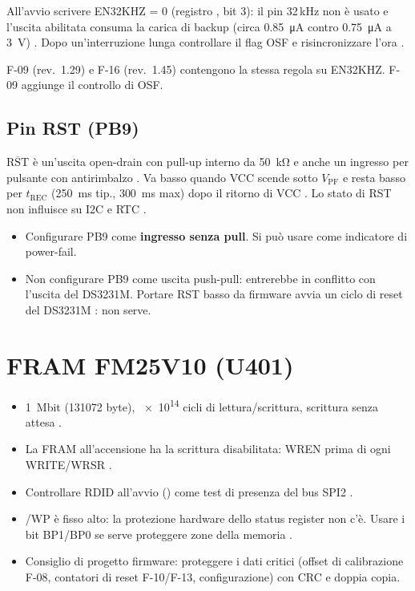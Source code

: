 \begin{regola}[F-09 e F-16: DS3231M]
All'avvio scrivere EN32KHZ = 0 (registro , bit 3): il pin 32\,kHz non è usato e l'uscita abilitata consuma la carica di backup (circa \SI{0.85}{\micro\ampere} contro \SI{0.75}{\micro\ampere} a \SI{3}{\volt}) . Dopo un'interruzione lunga controllare il flag OSF e risincronizzare l'ora .
\end{regola}

\begin{nota}[F-09 e F-16]
F-09 (rev.\ 1.29) e F-16 (rev.\ 1.45) contengono la stessa regola su EN32KHZ. F-09 aggiunge il controllo di OSF.
\end{nota}

\subsection{Pin RST (PB9)}
\label{sec:rtc-rst}
\(\overline{\mathrm{RST}}\) è un'uscita open-drain con pull-up interno da \SI{50}{\kilo\ohm} e anche un ingresso per pulsante con antirimbalzo . Va basso quando VCC scende sotto $V_\text{PF}$ e resta basso per $t_\text{REC}$ (\SI{250}{\milli\second} tip., \SI{300}{\milli\second} max) dopo il ritorno di VCC . Lo stato di RST non influisce su I2C e RTC .
\begin{itemize}
\item Configurare PB9 come \textbf{ingresso senza pull}. Si può usare come indicatore di power-fail.
\item Non configurare PB9 come uscita push-pull: entrerebbe in conflitto con l'uscita del DS3231M. Portare RST basso da firmware avvia un ciclo di reset del DS3231M : non serve.
\end{itemize}

\section{FRAM FM25V10 (U401)}
\begin{itemize}
\item \SI{1}{Mbit} (\num{131072} byte), \num{e14} cicli di lettura/scrittura, scrittura senza attesa .
\item La FRAM all'accensione ha la scrittura disabilitata: WREN prima di ogni WRITE/WRSR .
\item Controllare RDID all'avvio () come test di presenza del bus SPI2 .
\item /WP è fisso alto: la protezione hardware dello status register non c'è. Usare i bit BP1/BP0 se serve proteggere zone della memoria .
\item Consiglio di progetto firmware: proteggere i dati critici (offset di calibrazione F-08, contatori di reset F-10/F-13, configurazione) con CRC e doppia copia.
\end{itemize}
